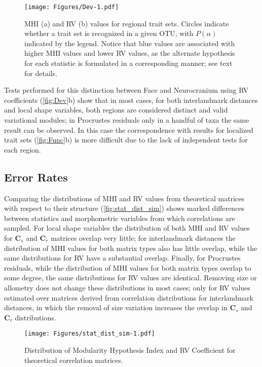 \documentclass[12pt,]{article}
\begin{document}
\begin{figure}[htbp]
\centering
\texttt{[image: Figures/Dev-1.pdf]}
\caption{MHI (a) and RV (b) values for regional trait sets. Circles
indicate whether a trait set is recognized in a given OTU, with
$P(\alpha)$ indicated by the legend. Notice that blue values are
associated with higher MHI values and lower RV values, as the alternate
hypothesis for each statistic is formulated in a corresponding manner;
see text for details. \label{fig:Dev}}
\end{figure}

Tests performed for this distinction between Face and Neurocranium using
RV coefficients (\autoref{fig:Dev}b) show that in most cases, for both
interlandmark distances and local shape variables, both regions are
considered distinct and valid variational modules; in Procrustes
residuals only in a handful of taxa the same result can be observed. In
this case the correspondence with results for localized trait sets
(\autoref{fig:Func}b) is more difficult due to the lack of independent
tests for each region.

\subsection{Error Rates}\label{error-rates}

Comparing the distributions of MHI and RV values from theoretical
matrices with respect to their structure (\autoref{fig:stat_dist_sim})
shows marked differences between statistics and morphometric variables
from which correlations are sampled. For local shape variables the
distribution of both MHI and RV values for $\mathbf{C}_s$ and
$\mathbf{C}_r$ matrices overlap very little; for interlandmark distances
the distribution of MHI values for both matrix types also has little
overlap, while the same distributions for RV have a substantial overlap.
Finally, for Procrustes residuals, while the distribution of MHI values
for both matrix types overlap to some degree, the same distributions for
RV values are identical. Removing size or allometry does not change
these distributions in most cases; only for RV values estimated over
matrices derived from correlation distributions for interlandmark
distances, in which the removal of size variation increases the overlap
in $\mathbf{C}_s$ and $\mathbf{C}_r$ distributions.

\begin{figure}[htbp]
\centering
\texttt{[image: Figures/stat\_dist\_sim-1.pdf]}
\caption{Distribution of Modularity Hypothesis Index and RV Coefficient
for theoretical correlation matrices. \label{fig:stat_dist_sim}}
\end{figure}
\end{document}
